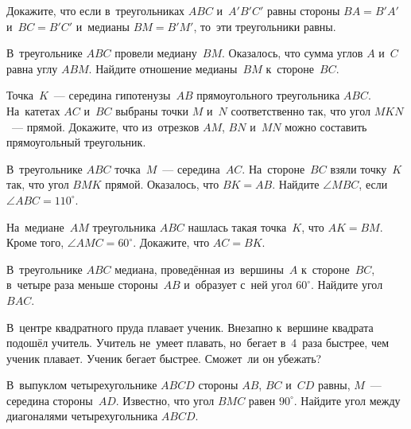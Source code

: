 


\begin{problems}

\item
Докажите, что если в~треугольниках $ABC$ и~$A'B'C'$ равны стороны $BA = B'A'$
и~$BC = B'C'$ и~медианы $BM = B'M'$, то~эти треугольники равны.

\item
В~треугольнике $ABC$ провели медиану~$BM$.
Оказалось, что сумма углов $A$ и~$C$ равна углу $ABM$.
Найдите отношение медианы~$BM$ к~стороне~$BC$.

\item
Точка~$K$~--- середина гипотенузы~$AB$ прямоугольного треугольника $ABC$.
На~катетах $AC$ и~$BC$ выбраны точки $M$ и~$N$ соответственно так, что
угол $MKN$~--- прямой.
Докажите, что из~отрезков $AM$, $BN$ и~$MN$ можно составить прямоугольный
треугольник.

\item
В~треугольнике $ABC$ точка~$M$~--- середина~$AC$.
На~стороне~$BC$ взяли точку~$K$ так, что угол $BMK$ прямой.
Оказалось, что $BK = AB$.
Найдите $\angle MBC$, если $\angle ABC = 110^{\circ}$.

\item
На~медиане~$AM$ треугольника $ABC$ нашлась такая точка~$K$, что  $AK = BM$.
Кроме того, $\angle AMC = 60^{\circ}$.
Докажите, что $AC = BK$.

\item
В~треугольнике $ABC$ медиана, проведённая из~вершины~$A$ к~стороне~$BC$,
в~четыре раза меньше стороны~$AB$ и~образует с~ней угол $60^{\circ}$.
Найдите угол $BAC$.

\item
В~центре квадратного пруда плавает ученик.
Внезапно к~вершине квадрата подошёл учитель.
Учитель не~умеет плавать, но~бегает в~4~раза быстрее, чем ученик плавает.
Ученик бегает быстрее.
Сможет~ли он убежать?

\item
В~выпуклом четырехугольнике $ABCD$ стороны $AB$, $BC$ и~$CD$ равны,
$M$~--- середина стороны~$AD$.
Известно, что угол $BMC$ равен $90^\circ$.
Найдите угол между диагоналями четырехугольника $ABCD$.

\end{problems}

